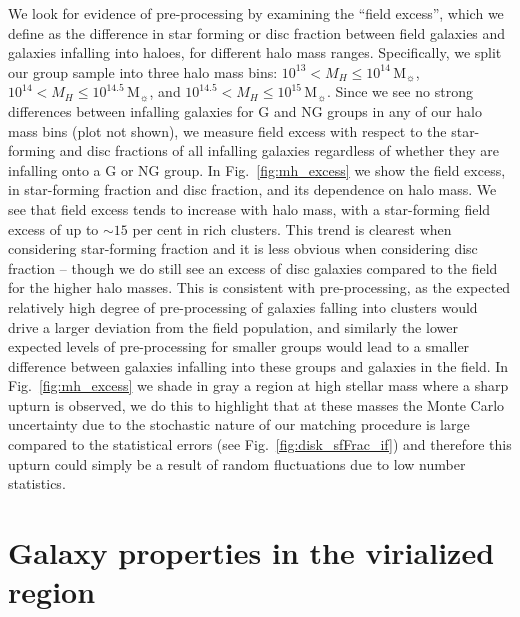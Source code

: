 \documentclass[a4paper,fleqn,usenatbib]{mnras}
\newcommand{\Msun}{\,\mathrm{M_{\sun}}}
\begin{document}
We look for evidence of pre-processing by examining the ``field
excess'', which we define as the difference in star forming or disc
fraction between field galaxies and galaxies infalling into haloes,
for different halo mass ranges.  Specifically, we split our group
sample into three halo mass bins: $10^{13} < M_H \le 10^{14}\Msun$,
  $10^{14} < M_H \le 10^{14.5}\Msun$, and $10^{14.5} < M_H \le
  10^{15}\Msun$.  Since we see no strong
differences between infalling galaxies for G and NG groups in any of
our halo mass bins (plot not shown), we measure field excess with
respect to the star-forming and
disc fractions of all infalling galaxies regardless of whether they
are infalling onto a G or NG group.  In Fig.~\ref{fig:mh_excess}  we show
the field excess, in star-forming fraction and disc
fraction, and its dependence on halo mass.  We see that field excess
tends to increase with halo mass, with a star-forming field excess of up to $\sim
15$ per cent in rich clusters.  This trend is clearest when
considering star-forming fraction and it is less obvious when
considering disc fraction -- though we do still 
see an excess of disc galaxies compared to the field for the higher
halo masses.  This is consistent with pre-processing, as
the expected relatively high degree of pre-processing of galaxies falling into
clusters would drive a larger deviation from the field population, and
similarly the lower expected levels of pre-processing for smaller
groups would lead to a smaller difference between galaxies infalling into
these groups and galaxies in the field.  In Fig.~\ref{fig:mh_excess}
we shade in gray a region at high stellar mass where a sharp upturn is
observed, we do this to highlight that at these masses the Monte Carlo
uncertainty due to the stochastic nature of our matching procedure is
large compared to the statistical errors (see
Fig.~\ref{fig:disk_sfFrac_if}) and therefore this upturn could simply
be a result of random fluctuations due to
low number statistics.


\section{Galaxy properties in the virialized region}
\label{sec:virial}
\end{document}
